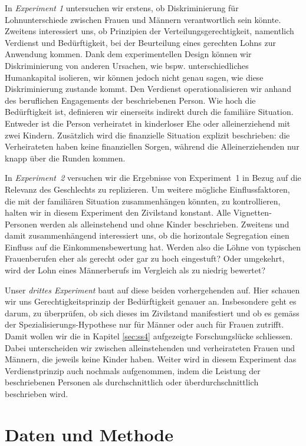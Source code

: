 \documentclass[a4paper,12pt]{article}
\begin{document}
In \emph{Experiment 1} untersuchen wir erstens, ob Diskriminierung für
Lohnunterschiede zwischen Frauen und Männern verantwortlich sein könnte.
Zweitens interessiert uns, ob Prinzipien der Verteilungsgerechtigkeit, namentlich Verdienst und Bedürftigkeit, bei der
Beurteilung eines gerechten Lohns zur Anwendung kommen. Dank dem
experimentellen Design können wir Diskriminierung von anderen Ursachen, wie
bspw. unterschiedliches Humankapital isolieren, wir können jedoch nicht genau
sagen, wie diese Diskriminierung zustande kommt. Den Verdienst operationalisieren wir anhand des beruflichen Engagements der beschriebenen Person. Wie hoch die Bedürftigkeit ist, definieren wir einerseits indirekt durch die familiäre Situation. Entweder ist die Person verheiratet in kinderloser Ehe oder alleinerziehend mit zwei Kindern. Zusätzlich   wird die finanzielle Situation explizit beschrieben: die Verheirateten haben keine finanziellen Sorgen, während die Alleinerziehenden nur knapp über die Runden kommen.

In \emph{Experiment~2} versuchen wir die Ergebnisse von Experiment~1 in Bezug auf die
Relevanz des Geschlechts zu replizieren. Um weitere mögliche Einflussfaktoren,
die mit der familiären Situation zusammenhängen könnten, zu kontrollieren,
halten wir in diesem Experiment den Zivilstand konstant. Alle
Vignetten-Personen werden als alleinstehend und ohne Kinder beschrieben. Zweitens und damit zusammenhängend interessiert uns, ob die horizontale Segregation einen Einfluss auf
die Einkommensbewertung hat. Werden also die Löhne von typischen Frauenberufen eher als gerecht oder gar zu hoch eingestuft? Oder umgekehrt, wird der Lohn eines Männerberufs im Vergleich als zu niedrig bewertet?

Unser \emph{drittes Experiment} baut auf diese beiden vorhergehenden auf. Hier schauen wir uns Gerechtigkeitsprinzip der Bedürftigkeit genauer an. Insbesondere geht es darum, zu überprüfen, ob sich dieses im Zivilstand manifestiert und ob es
gemäss der Spezialisierungs-Hypothese nur für Männer oder auch für Frauen zutrifft. Damit wollen wir die in Kapitel \ref{sec:ss4} aufgezeigte Forschungslücke schliessen. Dabei unterscheiden wir zwischen alleinstehenden und verheirateten Frauen und Männern, die jeweils keine Kinder haben. Weiter wird in diesem Experiment das Verdienstprinzip auch nochmals aufgenommen, indem die Leistung der beschriebenen Personen als durchschnittlich oder überdurchschnittlich beschrieben wird.

\section{Daten und Methode}
\label{sec:s3}
\end{document}
